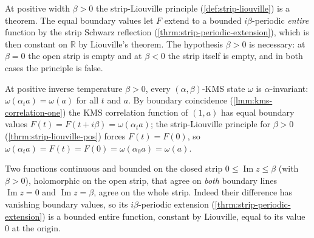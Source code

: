 \begin{theorem}
    \label{thrm:strip-liouville-pos}
    \leanok
    At positive width $\beta > 0$ the strip-Liouville principle (\ref{def:strip-liouville}) is a theorem. The equal boundary values let $F$ extend to a bounded $i\beta$-periodic \emph{entire} function by the strip Schwarz reflection (\ref{thrm:strip-periodic-extension}), which is then constant on $\mathbb{R}$ by Liouville's theorem. The hypothesis $\beta > 0$ is necessary: at $\beta = 0$ the open strip is empty and at $\beta < 0$ the strip itself is empty, and in both cases the principle is false.
\end{theorem}

\begin{theorem}
    \label{thrm:kms-invariance}
    \leanok
    At positive inverse temperature $\beta > 0$, every $(\alpha, \beta)$-KMS state $\omega$ is $\alpha$-invariant: $\omega(\alpha_t a) = \omega(a)$ for all $t$ and $a$. By boundary coincidence (\ref{lmm:kms-correlation-one}) the KMS correlation function of $(1, a)$ has equal boundary values $F(t) = F(t + i\beta) = \omega(\alpha_t a)$; the strip-Liouville principle for $\beta > 0$ (\ref{thrm:strip-liouville-pos}) forces $F(t) = F(0)$, so $\omega(\alpha_t a) = F(t) = F(0) = \omega(\alpha_0 a) = \omega(a)$.
\end{theorem}

\begin{theorem}
    \label{thrm:strip-uniqueness}
    \leanok
    Two functions continuous and bounded on the closed strip $0 \le \operatorname{Im} z \le \beta$ (with $\beta > 0$), holomorphic on the open strip, that agree on \emph{both} boundary lines $\operatorname{Im} z = 0$ and $\operatorname{Im} z = \beta$, agree on the whole strip. Indeed their difference has vanishing boundary values, so its $i\beta$-periodic extension (\ref{thrm:strip-periodic-extension}) is a bounded entire function, constant by Liouville, equal to its value $0$ at the origin.
\end{theorem}

